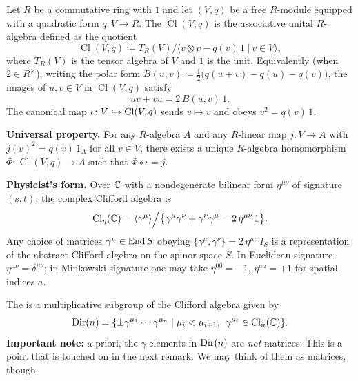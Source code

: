 \documentclass[11pt]{article}
\begin{document}
\begin{definition}
    Let $R$ be a commutative ring with $1$ and let $(V, q)$ be a free $R$-module
    equipped with a quadratic form $q \colon V \to R$. The 
    $\operatorname{Cl}(V, q)$ is the associative unital $R$-algebra defined as the
    quotient
    \[
        \operatorname{Cl}(V, q) \coloneqq T_R(V)\Big/ \big\langle v \otimes v - q(v)\,1 \: \big| \: v \in V \big\rangle,
    \]
    where $T_R(V)$ is the tensor algebra of $V$ and $1$ is the unit. Equivalently
    (when $2 \in R^\times$), writing the polar form $B(u, v) \coloneqq \tfrac{1}{2}\big(q(u+v)-q(u)-q(v)\big)$,
    the images of $u, v \in V$ in $\operatorname{Cl}(V, q)$ satisfy
    \[
        uv + vu = 2\,B(u, v)\,1.
    \]
    The canonical map $\iota \colon V \hookrightarrow \operatorname{Cl}(V, q)$ sends $v \mapsto v$ and
    obeys $v^2 = q(v)\,1$.

    \textbf{Universal property.} For any $R$-algebra $A$ and any $R$-linear map
    $j \colon V \to A$ with $j(v)^2 = q(v)\,1_A$ for all $v \in V$, there exists a unique
    $R$-algebra homomorphism $\Phi \colon \operatorname{Cl}(V, q) \to A$ such that
    $\Phi \circ \iota = j$.

    \textbf{Physicist's form.} Over $\mathbb{C}$ with a nondegenerate bilinear form
    $\eta^{\mu \nu}$ of signature $(s, t)$, the complex Clifford algebra is
    \[
        \operatorname{Cl}_{\eta}(\mathbb{C}) = \langle \gamma^\mu \rangle \Big/ \big\{ \gamma^\mu \gamma^\nu + \gamma^\nu \gamma^\mu = 2 \, \eta^{\mu \nu} \, 1 \big\}.
    \]
    Any choice of matrices $\gamma^\mu \in \operatorname{End}{S}$ obeying $\{ \gamma^\mu, \gamma^\nu \} = 2 \, \eta^{\mu \nu} \, I_S$
    is a representation of the abstract Clifford algebra on the spinor space $S$.
    In Euclidean signature $\eta^{\mu \nu} = \delta^{\mu \nu}$; in Minkowski signature one may
    take $\eta^{00} = -1$, $\eta^{aa} = +1$ for spatial indices $a$.
\end{definition}

\begin{definition}
    The  is a multiplicative subgroup of the Clifford algebra
    given by 
    \begin{align*}
        {\rm Dir}(n) = \{ \pm \gamma^{\mu_1} \cdots \gamma^{\mu_n} \mid \mu_i < \mu_{i + 1}, \: \: \gamma^{\mu_i} \in \operatorname{Cl}_n(\mathbb{C}) \}.
    \end{align*}
    \textbf{Important note:} a priori, the $\gamma$-elements in ${\rm Dir}(n)$
    are \emph{not} matrices. This is a point that is touched on in the
    next remark. We may think of them as matrices, though.
\end{definition}
\end{document}
